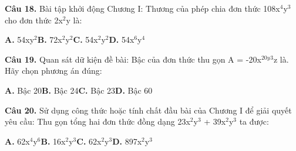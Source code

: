 \documentclass[11pt,a4paper]{article}
\begin{document}
\textbf{\color{primary} Câu 18.} Bài tập khởi động Chương I: Thương của phép chia đơn thức 108x$^4$y$^3$ cho đơn thức 2x$^2$y là:\par
\hspace*{1.5em}\textbf{A.} 54xy$^2$\quad\quad \textbf{B.} 72x$^2$y$^2$\quad\quad \textbf{C.} 54x$^2$y$^2$\quad\quad \textbf{D.} 54x$^6$y$^4$\par\vspace{2pt}
\textbf{\color{primary} Câu 19.} Quan sát dữ kiện đề bài: Bậc của đơn thức thu gọn A = -20x$^{20y}$$^3$z là. Hãy chọn phương án đúng:\par
\hspace*{1.5em}\textbf{A.} Bậc 20\quad\quad \textbf{B.} Bậc 24\quad\quad \textbf{C.} Bậc 23\quad\quad \textbf{D.} Bậc 60\par\vspace{2pt}
\textbf{\color{primary} Câu 20.} Sử dụng công thức hoặc tính chất đầu bài của Chương I để giải quyết yêu cầu: Thu gọn tổng hai đơn thức đồng dạng 23x$^2$y$^3$ + 39x$^2$y$^3$ ta được:\par
\hspace*{1.5em}\textbf{A.} 62x$^4$y$^6$\quad\quad \textbf{B.} 16x$^2$y$^3$\quad\quad \textbf{C.} 62x$^2$y$^3$\quad\quad \textbf{D.} 897x$^2$y$^3$\par\vspace{2pt}
\end{document}
